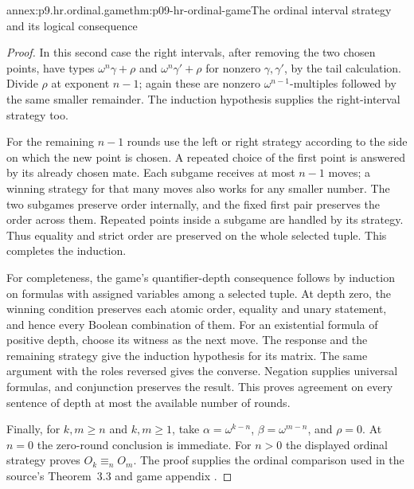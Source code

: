 \begin{annexitem}{annex:p9.hr.ordinal.game}{thm:p09-hr-ordinal-game}{The ordinal interval strategy and its logical consequence}
\begin{proof}
In this second case the right intervals,
after removing the two chosen points,
have types \(\omega^n\gamma+\rho\)
and \(\omega^n\gamma'+\rho\) for
nonzero \(\gamma,\gamma'\), by the
tail calculation. Divide \(\rho\)
at exponent \(n-1\); again these
are nonzero \(\omega^{n-1}\)-multiples
followed by the same smaller remainder.
The induction hypothesis supplies the
right-interval strategy too.

For the remaining \(n-1\) rounds use
the left or right strategy according
to the side on which the new point
is chosen. A repeated choice of the
first point is answered by its already
chosen mate. Each subgame receives
at most \(n-1\) moves; a winning
strategy for that many moves also
works for any smaller number.
The two subgames preserve order
internally, and the fixed first
pair preserves the order across
them. Repeated points inside a
subgame are handled by its strategy.
Thus equality and strict order are
preserved on the whole selected
tuple. This completes the induction.

For completeness, the game's
quantifier-depth consequence follows
by induction on formulas with assigned
variables among a selected tuple.
At depth zero, the winning condition
preserves each atomic order, equality
and unary statement, and hence every
Boolean combination of them.
For an existential formula of
positive depth, choose its witness
as the next move. The response and
the remaining strategy give the
induction hypothesis for its matrix.
The same argument with the roles
reversed gives the converse.
Negation supplies universal formulas,
and conjunction preserves the result.
This proves agreement on every
sentence of depth at most the
available number of rounds.

Finally, for \(k,m\geq n\) and
\(k,m\geq1\), take
\(\alpha=\omega^{k-n}\),
\(\beta=\omega^{m-n}\), and
\(\rho=0\). At \(n=0\) the
zero-round conclusion is immediate.
For \(n>0\) the displayed ordinal
strategy proves \(O_k\equiv_n O_m\).
The proof supplies the ordinal
comparison used in the source's
Theorem~3.3 and game appendix
\cite[pp.~9, 13--14]{HirshfeldRabinovich2003Future}.
\end{proof}
\end{annexitem}

